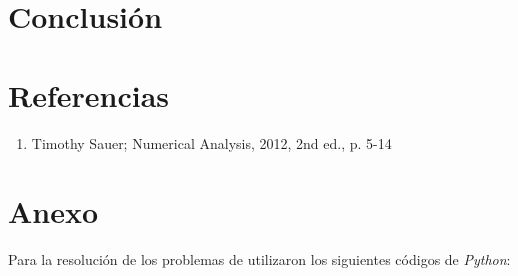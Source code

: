 \documentclass[10pt]{article}
\begin{document}
\section{Conclusión}

\section{Referencias}
\begin{enumerate}
\item Timothy Sauer; Numerical Analysis, 2012, 2nd ed., p. 5-14
\end{enumerate}

\section{Anexo}
Para la resolución de los problemas de utilizaron los siguientes códigos de  \textit{Python}:
\end{document}
